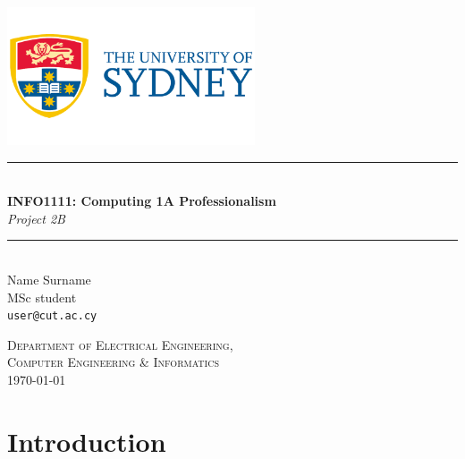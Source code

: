 \documentclass[12pt,a4paper]{article}
\newcommand{\HRule}{\rule{\linewidth}{0.5mm}}
\begin{document}
\begin{titlepage}
\begin{center}

\includegraphics[width=0.55\textwidth]{the-university-of-sydney-vector-logo}~\\[2cm]


\HRule \\[0.4cm]
{ \LARGE 
  \textbf{INFO1111: Computing 1A Professionalism}\\[0.4cm]
  \emph{Project 2B}\\[0.4cm]
}
\HRule \\[1.5cm]



{ \large
  Name Surname \\[0.1cm]
  MSc student\\[0.1cm]
  \texttt{user@cut.ac.cy}
}

\vfill

\textsc{\large Department of Electrical Engineering,\\Computer Engineering \& Informatics}\\[0.4cm]


{\large \today}
 
\end{center}
\end{titlepage}


\newpage



\tableofcontents
{}
\newpage
\setcounter{page}{1}

\section{Introduction}\label{sec:intro}
\lipsum[1-2]
\newpage
\end{document}
